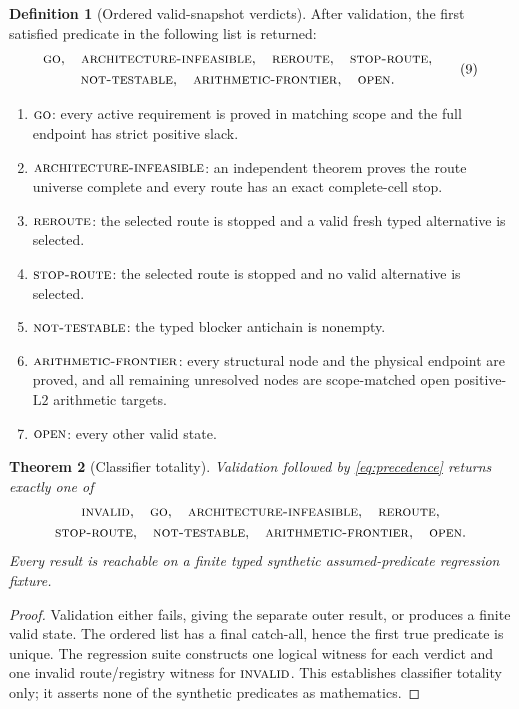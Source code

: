 \documentclass[11pt]{article}
\newtheorem{theorem}{Theorem}[section]
\theoremstyle{definition}
\newtheorem{definition}[theorem]{Definition}
\theoremstyle{remark}
\newcommand{\Ltwo}{\mathrm{L2}}
\newcommand{\GO}{\textnormal{\textsc{go}}}
\newcommand{\AINF}{\textnormal{\textsc{architecture-infeasible}}}
\newcommand{\REROUTE}{\textnormal{\textsc{reroute}}}
\newcommand{\STOPR}{\textnormal{\textsc{stop-route}}}
\newcommand{\NT}{\textnormal{\textsc{not-testable}}}
\newcommand{\AF}{\textnormal{\textsc{arithmetic-frontier}}}
\newcommand{\OPEN}{\textnormal{\textsc{open}}}
\newcommand{\INVALID}{\textnormal{\textsc{invalid}}}
\begin{document}
\begin{definition}[Ordered valid-snapshot verdicts]
After validation, the first satisfied predicate in the following list
is returned:
\[
\begin{gathered}
\GO,\quad\AINF,\quad\REROUTE,\quad\STOPR,\\
\NT,\quad\AF,\quad\OPEN.
\end{gathered}
\tag{9}\label{eq:precedence}
\]
\begin{enumerate}[label=(\roman*),leftmargin=2.2em]
\item \(\GO\): every active requirement is proved in matching scope
  and the full endpoint has strict positive slack.
\item \(\AINF\): an independent theorem proves the route universe
  complete and every route has an exact complete-cell stop.
\item \(\REROUTE\): the selected route is stopped and a valid fresh
  typed alternative is selected.
\item \(\STOPR\): the selected route is stopped and no valid
  alternative is selected.
\item \(\NT\): the typed blocker antichain is nonempty.
\item \(\AF\): every structural node and the physical endpoint are
  proved, and all remaining unresolved nodes are scope-matched open
  positive-\(\Ltwo\) arithmetic targets.
\item \(\OPEN\): every other valid state.
\end{enumerate}
\end{definition}

\begin{theorem}[Classifier totality]
Validation followed by \cref{eq:precedence} returns exactly one of
\[
 \begin{gathered}
 \INVALID,\quad\GO,\quad\AINF,\quad\REROUTE,\\
 \STOPR,\quad\NT,\quad\AF,\quad\OPEN.
 \end{gathered}
\]
Every result is reachable on a finite typed synthetic
assumed-predicate regression fixture.
\end{theorem}

\begin{proof}
Validation either fails, giving the separate outer result, or produces
a finite valid state.  The ordered list has a final catch-all, hence
the first true predicate is unique.  The regression suite constructs
one logical witness for each verdict and one invalid route/registry
witness for \(\INVALID\).  This establishes classifier totality only;
it asserts none of the synthetic predicates as mathematics.
\end{proof}
\end{document}
